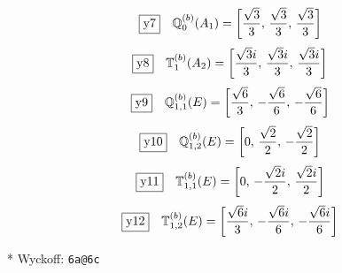 \documentclass[fleqn,10pt,landscape]{jsarticle}
\begin{document}
\begin{dmath*}
\fbox{y7}\quad \mathbb{Q}_{0}^{(b)}(A_{1})=\left[ \frac{\sqrt{3}}{3},\, \frac{\sqrt{3}}{3},\, \frac{\sqrt{3}}{3} \right]
\end{dmath*}
\begin{dmath*}
\fbox{y8}\quad \mathbb{T}_{1}^{(b)}(A_{2})=\left[ \frac{\sqrt{3} i}{3},\, \frac{\sqrt{3} i}{3},\, \frac{\sqrt{3} i}{3} \right]
\end{dmath*}
\begin{dmath*}
\fbox{y9}\quad \mathbb{Q}_{1,1}^{(b)}(E)=\left[ \frac{\sqrt{6}}{3},\, - \frac{\sqrt{6}}{6},\, - \frac{\sqrt{6}}{6} \right]
\end{dmath*}
\begin{dmath*}
\fbox{y10}\quad \mathbb{Q}_{1,2}^{(b)}(E)=\left[ 0,\, \frac{\sqrt{2}}{2},\, - \frac{\sqrt{2}}{2} \right]
\end{dmath*}
\begin{dmath*}
\fbox{y11}\quad \mathbb{T}_{1,1}^{(b)}(E)=\left[ 0,\, - \frac{\sqrt{2} i}{2},\, \frac{\sqrt{2} i}{2} \right]
\end{dmath*}
\begin{dmath*}
\fbox{y12}\quad \mathbb{T}_{1,2}^{(b)}(E)=\left[ \frac{\sqrt{6} i}{3},\, - \frac{\sqrt{6} i}{6},\, - \frac{\sqrt{6} i}{6} \right]
\end{dmath*}
\vspace{5mm}

\noindent ** Wyckoff: \texttt{6a@6c}
\end{document}
